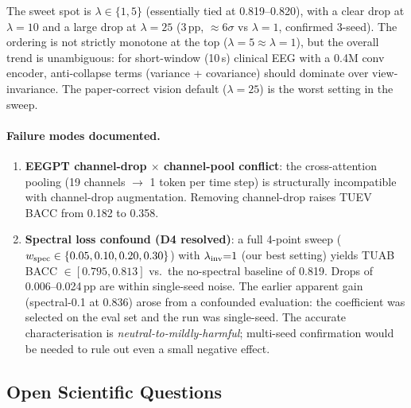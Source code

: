 \documentclass[11pt,a4paper]{article}
\begin{document}
The sweet spot is $\lambda \in \{1, 5\}$ (essentially tied at 0.819--0.820),
with a clear drop at $\lambda{=}10$ and a large drop at $\lambda{=}25$
($3\,\text{pp}$, ${\approx}6\sigma$ vs $\lambda{=}1$, confirmed 3-seed).
The ordering is not strictly monotone at the top ($\lambda{=}5 \approx \lambda{=}1$),
but the overall trend is unambiguous: for short-window (10\,s) clinical EEG
with a 0.4M conv encoder, anti-collapse terms (variance + covariance) should
dominate over view-invariance.  The paper-correct vision default ($\lambda{=}25$)
is the worst setting in the sweep.

\paragraph{Failure modes documented.}
\begin{enumerate}[noitemsep]
  \item \textbf{EEGPT channel-drop $\times$ channel-pool conflict}: the cross-attention
    pooling (19 channels $\to$ 1 token per time step) is structurally incompatible with
    channel-drop augmentation.  Removing channel-drop raises TUEV BACC from 0.182 to 0.358.
  \item \textbf{Spectral loss confound (D4 resolved)}:
    a full 4-point sweep ($w_{\rm spec} \in \{0.05, 0.10, 0.20, 0.30\}$) with
    $\lambda_{\rm inv}{=}1$ (our best setting) yields TUAB BACC $\in [0.795, 0.813]$
    vs.\ the no-spectral baseline of 0.819.
    Drops of 0.006--0.024\,pp are within single-seed noise.
    The earlier apparent gain (spectral-0.1 at 0.836) arose from a confounded evaluation:
    the coefficient was selected on the eval set and the run was single-seed.
    The accurate characterisation is \emph{neutral-to-mildly-harmful}; multi-seed
    confirmation would be needed to rule out even a small negative effect.
\end{enumerate}

\subsection{Open Scientific Questions}
\end{document}
